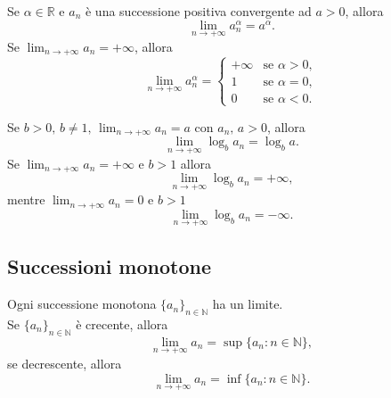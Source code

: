 \begin{proposition}\label{prop:successione_positiva_crescente}
    Se $\alpha\in\mathbb R$ e $a_n$ è una successione positiva convergente ad $a>0$, allora
    \begin{equation*}
        \lim_{n\rightarrow+\infty}a_n^\alpha =a^\alpha.
    \end{equation*}
    Se $\lim_{n\rightarrow+\infty}a_n=+\infty$, allora
    \begin{equation*}
        \lim_{n\rightarrow+\infty}a_n^\alpha=
        \begin{cases}
            +\infty & \text{se } \alpha>0,\\
            1 &\text{se } \alpha = 0,\\
            0 &\text{se } \alpha<0.
        \end{cases}
    \end{equation*}
\end{proposition}

\begin{proposition}\label{prop:limite_log}
    Se $b>0,\, b\neq 1,\, \lim_{n\rightarrow+\infty}a_n=a$ con $a_n,\, a>0$, allora
    \begin{equation*}
        \lim_{n\rightarrow+\infty}\log_b a_n=\log_b a.
    \end{equation*}
    Se $\lim_{n\rightarrow+\infty}a_n=+\infty$ e $b>1$ allora
    \begin{equation*}
        \lim_{n\rightarrow+\infty}\log_b a_n=+\infty,
    \end{equation*}
    mentre $\lim_{n\rightarrow+\infty}a_n=0$ e $b>1$
    \begin{equation*}
        \lim_{n\rightarrow+\infty}\log_b a_n=-\infty.
    \end{equation*}
\end{proposition}

\subsection{Successioni monotone}
\begin{theorem}
    Ogni successione monotona $\{a_n\}_{n\in\mathbb N}$ ha un limite.\\
    Se $\{a_n\}_{n\in\mathbb N}$ è crecente, allora
    \begin{equation*}
        \lim_{n\rightarrow+\infty} a_n = \sup\{a_n\colon n\in\mathbb N\},
    \end{equation*}
    se decrescente, allora
    \begin{equation*}
        \lim_{n\rightarrow+\infty} a_n = \inf\{a_n\colon n\in\mathbb N\}.
    \end{equation*}
\end{theorem}

